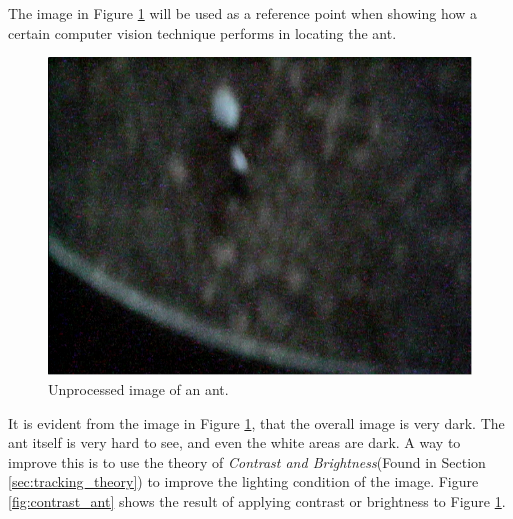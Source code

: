 The image in Figure \ref{fig:ant} will be used as a reference point when showing how a certain computer vision technique performs in locating the ant.

\begin{figure}[ht!]
  \centering
    \includegraphics[scale=0.25]{img/ant.png}
  \caption{Unprocessed image of an ant.}
  \label{fig:ant}
\end{figure}

It is evident from the image in Figure \ref{fig:ant}, that the overall image is very dark. The ant itself is very hard to see, and even the white areas are dark. A way to improve this is to use the theory of \emph{Contrast and Brightness}(Found in Section \ref{sec:tracking_theory}) to improve the lighting condition of the image. Figure \ref{fig:contrast_ant} shows the result of applying contrast or brightness to Figure \ref{fig:ant}. \\

